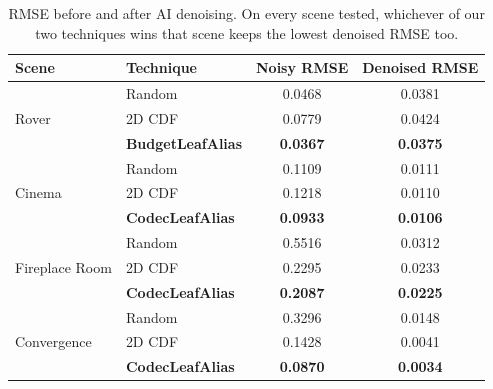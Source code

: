 \begin{table}[t]
\centering
\small
\caption{RMSE before and after AI denoising. On every scene tested, whichever of our two techniques wins that scene keeps the lowest denoised RMSE too.}
\label{tab:denoise}
\begin{tabular}{ll cc}
\toprule
Scene & Technique & Noisy RMSE & Denoised RMSE \\
\midrule
\multirow{3}{*}{Rover}
 & Random & 0.0468 & 0.0381 \\
 & 2D CDF & 0.0779 & 0.0424 \\
 & \textbf{BudgetLeafAlias} & \textbf{0.0367} & \textbf{0.0375} \\
\midrule
\multirow{3}{*}{Cinema}
 & Random & 0.1109 & 0.0111 \\
 & 2D CDF & 0.1218 & 0.0110 \\
 & \textbf{CodecLeafAlias} & \textbf{0.0933} & \textbf{0.0106} \\
\midrule
\multirow{3}{*}{Fireplace Room}
 & Random & 0.5516 & 0.0312 \\
 & 2D CDF & 0.2295 & 0.0233 \\
 & \textbf{CodecLeafAlias} & \textbf{0.2087} & \textbf{0.0225} \\
\midrule
\multirow{3}{*}{Convergence}
 & Random & 0.3296 & 0.0148 \\
 & 2D CDF & 0.1428 & 0.0041 \\
 & \textbf{CodecLeafAlias} & \textbf{0.0870} & \textbf{0.0034} \\
\bottomrule
\end{tabular}
\end{table}
